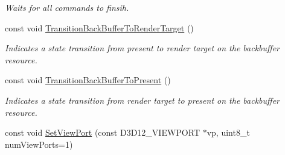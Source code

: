 \begin{DoxyCompactItemize}
\begin{DoxyCompactList}\small\item\em Waits for all commands to finsih. \end{DoxyCompactList}\item 
const void \hyperlink{class_ensum_1_1_graphics_1_1_direct3_d12_a1a27e56f7876cfbda9053c541723e2af}{Transition\+Back\+Buffer\+To\+Render\+Target} ()\hypertarget{class_ensum_1_1_graphics_1_1_direct3_d12_a1a27e56f7876cfbda9053c541723e2af}{}\label{class_ensum_1_1_graphics_1_1_direct3_d12_a1a27e56f7876cfbda9053c541723e2af}

\begin{DoxyCompactList}\small\item\em Indicates a state transition from present to render target on the backbuffer resource. \end{DoxyCompactList}\item 
const void \hyperlink{class_ensum_1_1_graphics_1_1_direct3_d12_a878c89936a686764b71ffa51d3b3ed3b}{Transition\+Back\+Buffer\+To\+Present} ()\hypertarget{class_ensum_1_1_graphics_1_1_direct3_d12_a878c89936a686764b71ffa51d3b3ed3b}{}\label{class_ensum_1_1_graphics_1_1_direct3_d12_a878c89936a686764b71ffa51d3b3ed3b}

\begin{DoxyCompactList}\small\item\em Indicates a state transition from render target to present on the backbuffer resource. \end{DoxyCompactList}\item 
const void \hyperlink{class_ensum_1_1_graphics_1_1_direct3_d12_a6d3a67e0619d6ac1938aa228783772cd}{Set\+View\+Port} (const D3\+D12\+\_\+\+V\+I\+E\+W\+P\+O\+RT $\ast$vp, uint8\+\_\+t num\+View\+Ports=1)\hypertarget{class_ensum_1_1_graphics_1_1_direct3_d12_a6d3a67e0619d6ac1938aa228783772cd}{}\label{class_ensum_1_1_graphics_1_1_direct3_d12_a6d3a67e0619d6ac1938aa228783772cd}


\end{DoxyCompactItemize}
